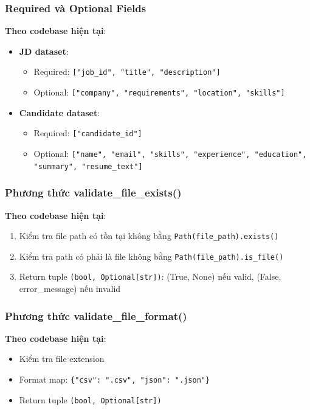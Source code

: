 \subsubsection{Required và Optional Fields}

\textbf{Theo codebase hiện tại}:
\begin{itemize}
    \item \textbf{JD dataset}:
    \begin{itemize}
        \item Required: \texttt{["job\_id", "title", "description"]}
        \item Optional: \texttt{["company", "requirements", "location", "skills"]}
    \end{itemize}
    \item \textbf{Candidate dataset}:
    \begin{itemize}
        \item Required: \texttt{["candidate\_id"]}
        \item Optional: \texttt{["name", "email", "skills", "experience", "education", "summary", "resume\_text"]}
    \end{itemize}
\end{itemize}

\subsubsection{Phương thức validate\_file\_exists()}

\textbf{Theo codebase hiện tại}:
\begin{enumerate}
    \item Kiểm tra file path có tồn tại không bằng \texttt{Path(file\_path).exists()}
    \item Kiểm tra path có phải là file không bằng \texttt{Path(file\_path).is\_file()}
    \item Return tuple \texttt{(bool, Optional[str])}: (True, None) nếu valid, (False, error\_message) nếu invalid
\end{enumerate}

\subsubsection{Phương thức validate\_file\_format()}

\textbf{Theo codebase hiện tại}:
\begin{itemize}
    \item Kiểm tra file extension
    \item Format map: \texttt{\{"csv": ".csv", "json": ".json"\}}
    \item Return tuple \texttt{(bool, Optional[str])}
\end{itemize}

